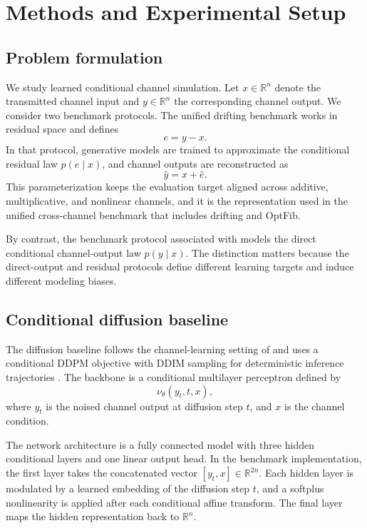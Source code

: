 \section{Methods and Experimental Setup}
\label{sec:methods}

\subsection{Problem formulation}
We study learned conditional channel simulation.
Let \(x \in \mathbb{R}^n\) denote the transmitted channel input and \(y \in \mathbb{R}^n\) the corresponding channel output.
We consider two benchmark protocols.
The unified drifting benchmark works in residual space and defines
\begin{equation}
e = y - x.
\end{equation}
In that protocol, generative models are trained to approximate the conditional residual law \(p(e \mid x)\), and channel outputs are reconstructed as
\begin{equation}
\hat{y} = x + \hat{e}.
\end{equation}
This parameterization keeps the evaluation target aligned across additive, multiplicative, and nonlinear channels, and it is the representation used in the unified cross-channel benchmark that includes drifting and OptFib.

By contrast, the benchmark protocol associated with \cite{paper2309} models the direct conditional channel-output law \(p(y \mid x)\).
The distinction matters because the direct-output and residual protocols define different learning targets and induce different modeling biases.

\subsection{Conditional diffusion baseline}
The diffusion baseline follows the channel-learning setting of \cite{paper2309} and uses a conditional DDPM objective \cite{ddpm} with DDIM sampling for deterministic inference trajectories \cite{ddim}.
The backbone is a conditional multilayer perceptron defined by
\begin{equation}
\nu_\theta(y_t, t, x),
\end{equation}
where \(y_t\) is the noised channel output at diffusion step \(t\), and \(x\) is the channel condition.

The network architecture is a fully connected model with three hidden conditional layers and one linear output head.
In the benchmark implementation, the first layer takes the concatenated vector \([y_t, x] \in \mathbb{R}^{2n}\).
Each hidden layer is modulated by a learned embedding of the diffusion step \(t\), and a softplus nonlinearity is applied after each conditional affine transform.
The final layer maps the hidden representation back to \(\mathbb{R}^n\).

